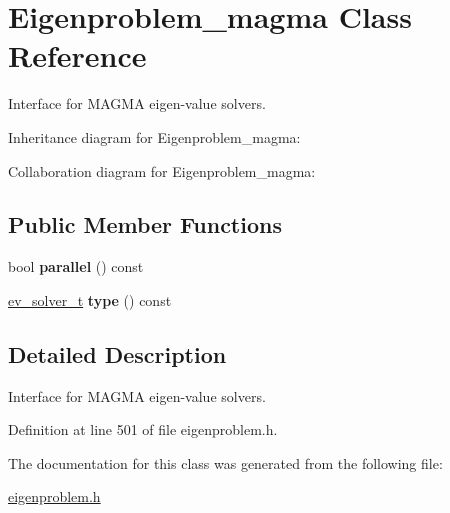 \hypertarget{class_eigenproblem__magma}{}\section{Eigenproblem\+\_\+magma Class Reference}
\label{class_eigenproblem__magma}


Interface for M\+A\+G\+M\+A eigen-\/value solvers.  




Inheritance diagram for Eigenproblem\+\_\+magma\+:


Collaboration diagram for Eigenproblem\+\_\+magma\+:
\subsection*{Public Member Functions}
\begin{DoxyCompactItemize}
\item 
\hypertarget{class_eigenproblem__magma_a63874203cbec40d72e6734fbf45833ed}{}bool {\bfseries parallel} () const \label{class_eigenproblem__magma_a63874203cbec40d72e6734fbf45833ed}

\item 
\hypertarget{class_eigenproblem__magma_a589cadba69d1c9d4a917b9262786d69d}{}\hyperlink{eigenproblem_8h_a203f2c57422a6e64834e6e9ab85982bf}{ev\+\_\+solver\+\_\+t} {\bfseries type} () const \label{class_eigenproblem__magma_a589cadba69d1c9d4a917b9262786d69d}

\end{DoxyCompactItemize}


\subsection{Detailed Description}
Interface for M\+A\+G\+M\+A eigen-\/value solvers. 

Definition at line 501 of file eigenproblem.\+h.



The documentation for this class was generated from the following file\+:\begin{DoxyCompactItemize}
\item 
\hyperlink{eigenproblem_8h}{eigenproblem.\+h}\end{DoxyCompactItemize}
